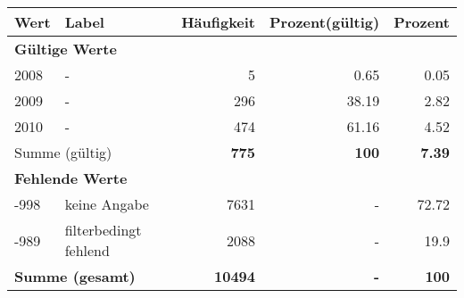      \begin{longtable}{lXrrr}
     \toprule
     \textbf{Wert} & \textbf{Label} & \textbf{Häufigkeit} & \textbf{Prozent(gültig)} & \textbf{Prozent} \\
     \endhead
     \midrule
     \multicolumn{5}{l}{\textbf{Gültige Werte}}\\

     2008 &
     \multicolumn{1}{X}{ -  } &


       \num{5} &
       \num[round-mode=places,round-precision=2]{0,65} &
         \num[round-mode=places,round-precision=2]{0,05} \\

     2009 &
     \multicolumn{1}{X}{ -  } &


       \num{296} &
       \num[round-mode=places,round-precision=2]{38,19} &
         \num[round-mode=places,round-precision=2]{2,82} \\

     2010 &
     \multicolumn{1}{X}{ -  } &


       \num{474} &
       \num[round-mode=places,round-precision=2]{61,16} &
         \num[round-mode=places,round-precision=2]{4,52} \\
     \midrule
     \multicolumn{2}{l}{Summe (gültig)} &
       \textbf{\num{775}} &
     \textbf{100} &
       \textbf{\num[round-mode=places,round-precision=2]{7,39}} \\
     \multicolumn{5}{l}{\textbf{Fehlende Werte}}\\
       -998 &
       keine Angabe &
         \num{7631} &
        - &
         \num[round-mode=places,round-precision=2]{72,72} \\
       -989 &
       filterbedingt fehlend &
         \num{2088} &
        - &
         \num[round-mode=places,round-precision=2]{19,9} \\
     \midrule
     \multicolumn{2}{l}{\textbf{Summe (gesamt)}} &
          \textbf{\num{10494}} &
        \textbf{-} &
        \textbf{100} \\
     \bottomrule
     \end{longtable}
     

